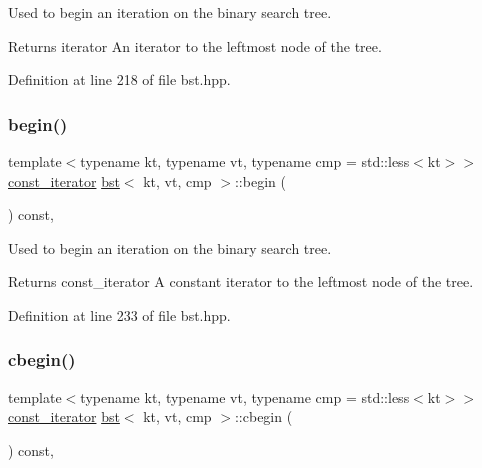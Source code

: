 Used to begin an iteration on the binary search tree. 

\begin{DoxyReturn}{Returns}
iterator An iterator to the leftmost node of the tree. 
\end{DoxyReturn}


Definition at line 218 of file bst.\+hpp.

\mbox{\label{classbst_a8631fb03856c2cd4602fc7446502195c}} 
\subsubsection{\texorpdfstring{begin()}{begin()}\hspace{0.1cm}{\footnotesize\ttfamily [2/2]}}
{\footnotesize\ttfamily template$<$typename kt, typename vt, typename cmp = std\+::less$<$kt$>$$>$ \\
\hyperlink{classbst_a72485696d999bf489c6156f6327a2163}{const\+\_\+iterator} \hyperlink{classbst}{bst}$<$ kt, vt, cmp $>$\+::begin (\begin{DoxyParamCaption}{ }\end{DoxyParamCaption}) const\hspace{0.3cm}{\ttfamily [inline]}, {\ttfamily [noexcept]}}



Used to begin an iteration on the binary search tree. 

\begin{DoxyReturn}{Returns}
const\+\_\+iterator A constant iterator to the leftmost node of the tree. 
\end{DoxyReturn}


Definition at line 233 of file bst.\+hpp.

\mbox{\label{classbst_a74e78aa7f879a5df0b933651174de42b}} 
\subsubsection{\texorpdfstring{cbegin()}{cbegin()}}
{\footnotesize\ttfamily template$<$typename kt, typename vt, typename cmp = std\+::less$<$kt$>$$>$ \\
\hyperlink{classbst_a72485696d999bf489c6156f6327a2163}{const\+\_\+iterator} \hyperlink{classbst}{bst}$<$ kt, vt, cmp $>$\+::cbegin (\begin{DoxyParamCaption}{ }\end{DoxyParamCaption}) const\hspace{0.3cm}{\ttfamily [inline]}, {\ttfamily [noexcept]}}



